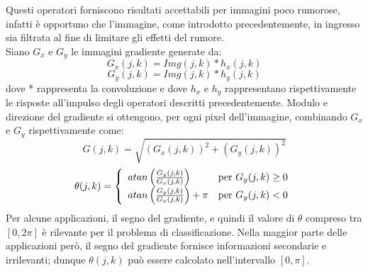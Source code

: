 Questi operatori forniscono risultati accettabili per immagini poco rumorose, infatti è opportuno che l'immagine, come introdotto precedentemente, in ingresso sia filtrata al fine di limitare gli effetti del rumore.
\\

Siano $G_{x}$ e $G_{y}$ le immagini gradiente generate da:
\begin{equation}
\label{eq:gradiente_su_x}
G_{x}(j,k)= Img(j,k) * h_{x}(j,k)
\end{equation}
\begin{equation}
\label{eq:gradiente_su_y}
G_{y}(j,k)=Img(j,k) * h_{y}(j,k)
\end{equation}
dove * rappresenta la convoluzione e dove $h_{x}$ e $h_{y}$ rappresentano rispettivamente le risposte all'impulso degli operatori descritti precedentemente.
Modulo e direzione del gradiente si ottengono, per ogni pixel dell'immagine, combinando $G_{x}$ e $G_{y}$ rispettivamente come:
\begin{equation}
\label{eq:"Forza_del_contorno"}
G(j,k)= \sqrt{(G_{x}(j,k))^2 + (G_{y}(j,k))^2}
\end{equation}
\begin{equation}
\label{eq:"Direzione_del_contorno"}
\theta(j,k)= \left\{ \begin{array}{ll} atan\left (\frac{G_{y}(j,k)}{G_{x}(j,k)}\right ) & \mbox{per } G_y(j,k)\geq 0 \\ atan\left (\frac{G_{y}(j,k)}{G_{x}(j,k)}\right )+\pi & \mbox{per } G_y(j,k)<0 \end{array} \right.
\end{equation}
Per alcune applicazioni, il segno del gradiente, e quindi il valore di $\theta$ compreso tra $[0,2\pi]$ è rilevante per il problema di classificazione. Nella maggior parte delle applicazioni però, il segno del gradiente fornisce informazioni secondarie e irrilevanti; dunque $\theta(j,k)$ può essere calcolato nell'intervallo $[0,\pi]$.\\


